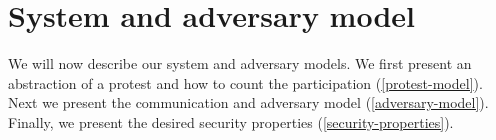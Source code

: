 \section{System and adversary model}%
\label{system-model}

We will now describe our system and adversary models.
We first present an abstraction of a protest and how to count the participation 
(\cref{protest-model}).
Next we present the communication and adversary model (\cref{adversary-model}).
Finally, we present the desired security properties 
(\cref{security-properties}).




